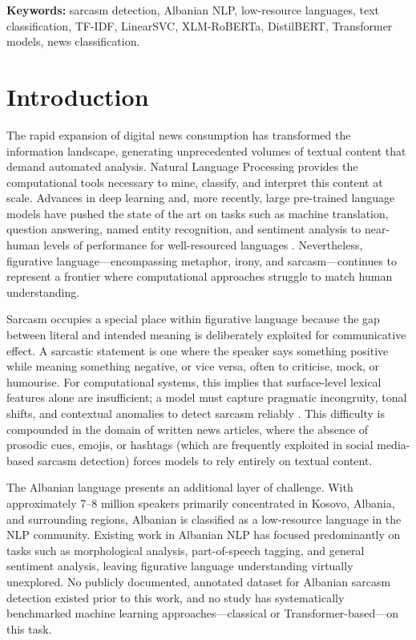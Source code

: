 \documentclass[12pt,a4paper]{article}
\begin{document}
\textbf{Keywords:} sarcasm detection, Albanian NLP, low-resource languages, text classification, TF-IDF, LinearSVC, XLM-RoBERTa, DistilBERT, Transformer models, news classification.

\newpage
\tableofcontents

\newpage
\section{Introduction}
\label{sec:introduction}

The rapid expansion of digital news consumption has transformed the information landscape, generating unprecedented volumes of textual content that demand automated analysis. Natural Language Processing provides the computational tools necessary to mine, classify, and interpret this content at scale. Advances in deep learning and, more recently, large pre-trained language models have pushed the state of the art on tasks such as machine translation, question answering, named entity recognition, and sentiment analysis to near-human levels of performance for well-resourced languages \citep{devlin2019bert, vaswani2017attention}. Nevertheless, figurative language---encompassing metaphor, irony, and sarcasm---continues to represent a frontier where computational approaches struggle to match human understanding.

Sarcasm occupies a special place within figurative language because the gap between literal and intended meaning is deliberately exploited for communicative effect. A sarcastic statement is one where the speaker says something positive while meaning something negative, or vice versa, often to criticise, mock, or humourise. For computational systems, this implies that surface-level lexical features alone are insufficient; a model must capture pragmatic incongruity, tonal shifts, and contextual anomalies to detect sarcasm reliably \citep{riloff2013sarcasm}. This difficulty is compounded in the domain of written news articles, where the absence of prosodic cues, emojis, or hashtags (which are frequently exploited in social media-based sarcasm detection) forces models to rely entirely on textual content.

The Albanian language presents an additional layer of challenge. With approximately 7--8 million speakers primarily concentrated in Kosovo, Albania, and surrounding regions, Albanian is classified as a low-resource language in the NLP community. Existing work in Albanian NLP has focused predominantly on tasks such as morphological analysis, part-of-speech tagging, and general sentiment analysis, leaving figurative language understanding virtually unexplored. No publicly documented, annotated dataset for Albanian sarcasm detection existed prior to this work, and no study has systematically benchmarked machine learning approaches---classical or Transformer-based---on this task.
\end{document}

